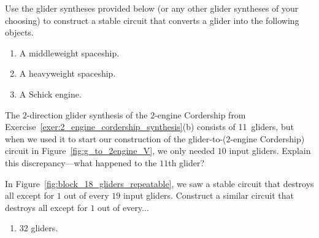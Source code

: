\begin{multicols}{2}
	
	\mfilbreak
	
	
	\begin{problem}\label{exer:convert_stable_g_to_spaceships}
		Use the glider syntheses provided below (or any other glider syntheses of your choosing) to construct a stable circuit that converts a glider into the following objects.\smallskip
		
		\begin{enumerate}[label=\bf\color{ocre}(\alph*)]
			\item A middleweight spaceship.
			
			\item A heavyweight spaceship.
			
			\item A Schick engine. %
		\end{enumerate}
	\end{problem}
	
	
	\mfilbreak
	
	
	\begin{problem}\label{fig:g_to_2engine_why_10_gliders}
		The $2$-direction glider synthesis of the $2$-engine Cordership from Exercise~\ref{exer:2_engine_cordership_synthesis}(b) consists of 11~gliders, but when we used it to start our construction of the glider-to-($2$-engine Cordership) circuit in Figure~\ref{fig:g_to_2engine_V}, we only needed $10$ input gliders. Explain this discrepancy---what happened to the $11$th glider?
	\end{problem}
	
	
	\mfilbreak
	
	
	\begin{problem}\label{exer:stable_thin_out_gliders}
		In Figure~\ref{fig:block_18_gliders_repeatable}, we saw a stable circuit that destroys all except for $1$ out of every $19$ input gliders. Construct a similar circuit that destroys all except for $1$ out of every...\smallskip
		
		\begin{enumerate}[label=\bf\color{ocre}(\alph*)]
			\item $32$ gliders.
			

\end{enumerate}
\end{problem}
\end{multicols}
